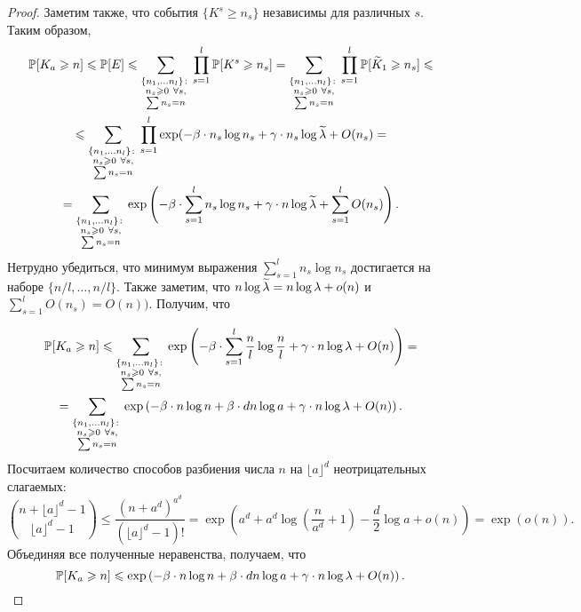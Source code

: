 \begin{proof}
Заметим также, что события $\{K^s \geq n_s\}$ независимы для различных $s$.\\
Таким образом,
\begin{multline*}
    \mathbb{P}[K_a\geqslant n] \leqslant
    \mathbb{P}[E] \leqslant 
    \sum_{\substack{\{n_1, \ldots n_l\}\colon\\ n_s \geqslant 0\ \forall s,\\ \sum n_s = n}}\prod_{s=1}^l\mathbb{P}[K^s\geqslant n_s] =
    \sum_{\substack{\{n_1, \ldots n_l\}\colon\\ n_s \geqslant 0\ \forall s,\\ \sum n_s = n}}\prod_{s=1}^l\mathbb{P}[\widetilde K_1\geqslant n_s]\leqslant \\
    \leqslant \sum_{\substack{\{n_1, \ldots n_l\}\colon\\ n_s \geqslant 0\ \forall s,\\ \sum n_s = n}}\prod_{s=1}^l \exp(-\beta\cdot n_s\log n_s + \gamma\cdot n_s\log\widetilde\lambda + O(n_s) =\\
    =\sum_{\substack{\{n_1, \ldots n_l\}\colon\\ n_s \geqslant 0\ \forall s,\\ \sum n_s = n}}\exp\left(-\beta\cdot \sum_{s=1}^l n_s\log n_s + \gamma\cdot n\log\widetilde\lambda + \sum_{s=1}^l O(n_s)\right).
    \end{multline*}
Нетрудно убедиться, что минимум выражения $\sum_{s=1}^l n_s\log n_s$ достигается на наборе $\{n/l, \ldots, n/l\}$. Также заметим, что $n\log\widetilde\lambda = n\log\lambda + o(n)$ и $\sum_{s=1}^lO(n_s) = O(n))$. Получим, что

    \begin{multline*}
    \mathbb{P}[K_a\geqslant n]\leqslant
    \sum_{\substack{\{n_1, \ldots n_l\}\colon\\ n_s \geqslant 0\ \forall s,\\ \sum n_s = n}}\exp\left(-\beta\cdot \sum_{s=1}^l \dfrac{n}{l}\log\dfrac{n}{l} + \gamma\cdot n\log\lambda + O(n)\right) = \\
    =\sum_{\substack{\{n_1, \ldots n_l\}\colon\\ n_s \geqslant 0\ \forall s,\\ \sum n_s = n}}\exp\left(-\beta\cdot n\log n + \beta\cdot dn\log a + \gamma\cdot n\log\lambda + O(n)\right).
    \end{multline*}
Посчитаем количество способов разбиения числа $n$ на $\lfloor a\rfloor^d$ неотрицательных слагаемых:
\begin{equation*}
    \binom{n + \lfloor a\rfloor^d - 1}{\lfloor a\rfloor^d - 1} \leq \dfrac{(n + a^d)^{a^d}}{(\lfloor a\rfloor^d -1)!} = \exp\left(a^d + a^d\log\left(\dfrac{n}{a^d}+1\right) - \dfrac{d}{2} \log a + o(n)\right) = \exp(o(n)).
\end{equation*}{}
Объединяя все полученные неравенства, получаем, что 
\begin{equation*}
    \mathbb{P}[K_a\geqslant n]\leqslant
    \exp\left(-\beta\cdot n\log n + \beta\cdot dn\log a + \gamma\cdot n\log\lambda + O(n) \right).
\end{equation*}{}
\end{proof}{}

